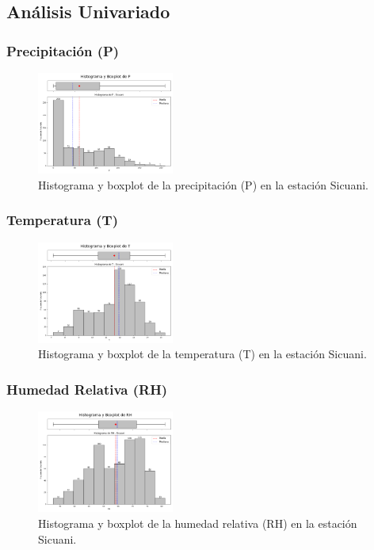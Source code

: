 \subsection{Análisis Univariado}

\subsubsection*{Precipitación (P)}
\begin{figure}[H]
\centering
\includegraphics[width=0.4\textwidth]{resultados/por_estacion_meteorologica/Sicuani/P_histograma.png}
\caption{Histograma y boxplot de la precipitación (P) en la estación Sicuani.}
\label{fig:sicuani_P}
\end{figure}

\subsubsection*{Temperatura (T)}
\begin{figure}[H]
\centering
\includegraphics[width=0.4\textwidth]{resultados/por_estacion_meteorologica/Sicuani/T_histograma.png}
\caption{Histograma y boxplot de la temperatura (T) en la estación Sicuani.}
\label{fig:sicuani_T}
\end{figure}

\subsubsection*{Humedad Relativa (RH)}
\begin{figure}[H]
\centering
\includegraphics[width=0.4\textwidth]{resultados/por_estacion_meteorologica/Sicuani/RH_histograma.png}
\caption{Histograma y boxplot de la humedad relativa (RH) en la estación Sicuani.}
\label{fig:sicuani_RH}
\end{figure}

